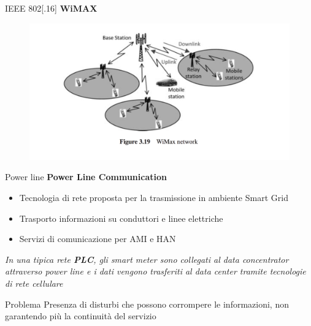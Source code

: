 \begin{frame}{IEEE 802[.16]}
	\textbf{WiMAX}
	\begin{figure}[h]
		\includegraphics[scale=0.3,cfbox=blue_slides 1pt 0pt]{imgs/wim.png}
	\end{figure}
\end{frame}

\begin{frame}{Power line}
	\textbf{Power Line Communication}
	\begin{itemize}[<+- | alert@+>]
		\item Tecnologia di rete proposta per la trasmissione in ambiente Smart Grid
		\item Trasporto informazioni su conduttori e linee elettriche %
		\item Servizi di comunicazione per AMI e HAN
	\end{itemize}
	\pause
	\begin{block}{}
		\textit{In una tipica rete \textbf{\color{blue_slides}PLC}, gli smart meter sono collegati al data concentrator attraverso power line e i dati vengono trasferiti al data center tramite tecnologie di rete cellulare}
	\end{block}
	\pause
	\begin{block}{Problema}
		Presenza di disturbi che possono corrompere le informazioni, non garantendo più la continuità del servizio
	\end{block}
\end{frame}

